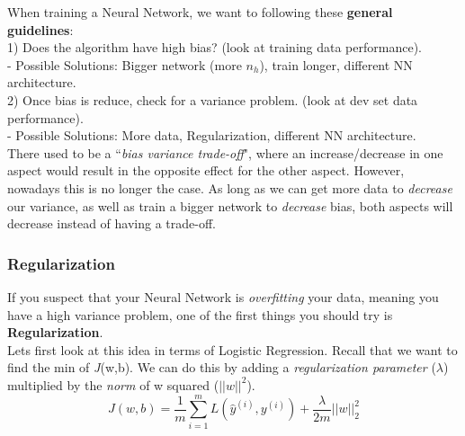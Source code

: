 \documentclass[11pt, a4paper]{article}
\begin{document}
\begin{spacing}{1.1}
	When training a Neural Network, we want to following these \textbf{general guidelines}: \vspace*{.5mm} \\
	\hspace*{3mm} 1) Does the algorithm have high bias? (look at training data performance). \\
	\hspace*{7mm} - Possible Solutions: Bigger network (more $n_h$), train longer, different NN architecture. \\
	\hspace*{3mm} 2) Once bias is reduce, check for a variance problem. (look at dev set data performance). \\
	\hspace*{7mm} - Possible Solutions: More data, Regularization, different NN architecture. \vspace*{1.5mm} \\
	There used to be a ``\textit{bias variance trade-off}", where an increase/decrease in one aspect would result in the opposite effect for the other aspect. However, nowadays this is no longer the case. As long as we can get more data to \textit{decrease} our variance, as well as train a bigger network to \textit{decrease} bias, both aspects will decrease instead of having a trade-off. 
	\subsubsection{Regularization}
	If you suspect that your Neural Network is \textit{overfitting} your data, meaning you have a high variance problem, one of the first things you should try is \textbf{Regularization}. \vspace*{1mm} \\ Lets first look at this idea in terms of Logistic Regression. Recall that we want to find the min of \textit{J}(w,b). We  can do this by adding a \textit{regularization parameter} ($\lambda$) multiplied by the \textit{norm} of w squared ($||w||^2$). $$ J(w,b) = \frac{1}{m} \sum_{i=1}^{m} L(\hat{y}^{(i)}, y^{(i)}) + \frac{\lambda}{2m} ||w||^2_2$$ \newpage


\end{spacing}
\end{document}

